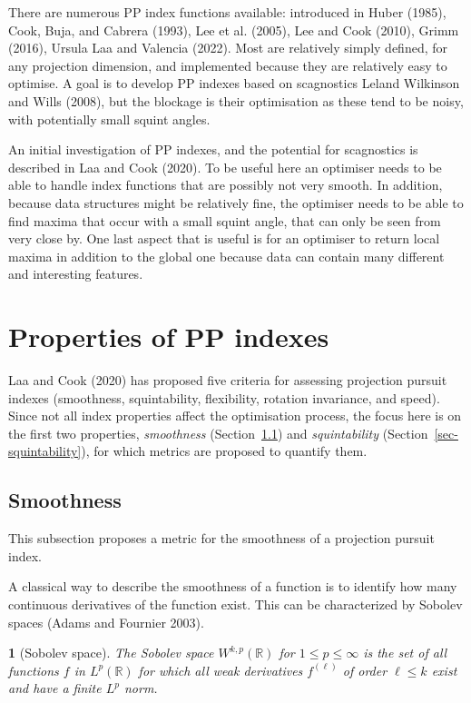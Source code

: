 \documentclass[
  12pt,
]{interact}
\theoremstyle{plain}
\newtheorem{defn}{\protect\definitionname}
\providecommand{\definitionname}{Definition}
\begin{document}
There are numerous PP index functions available: introduced in Huber
(1985), Cook, Buja, and Cabrera (1993), Lee et al. (2005), Lee and Cook
(2010), Grimm (2016), Ursula Laa and Valencia (2022). Most are
relatively simply defined, for any projection dimension, and implemented
because they are relatively easy to optimise. A goal is to develop PP
indexes based on scagnostics Leland Wilkinson and Wills (2008), but the
blockage is their optimisation as these tend to be noisy, with
potentially small squint angles.

An initial investigation of PP indexes, and the potential for
scagnostics is described in Laa and Cook (2020). To be useful here an
optimiser needs to be able to handle index functions that are possibly
not very smooth. In addition, because data structures might be
relatively fine, the optimiser needs to be able to find maxima that
occur with a small squint angle, that can only be seen from very close
by. One last aspect that is useful is for an optimiser to return local
maxima in addition to the global one because data can contain many
different and interesting features.

\hypertarget{sec-PP-properties}{%
\section{Properties of PP indexes}\label{sec-PP-properties}}

Laa and Cook (2020) has proposed five criteria for assessing projection
pursuit indexes (smoothness, squintability, flexibility, rotation
invariance, and speed). Since not all index properties affect the
optimisation process, the focus here is on the first two properties,
\emph{smoothness} (Section~\ref{sec-smoothness}) and
\emph{squintability} (Section~\ref{sec-squintability}), for which
metrics are proposed to quantify them.

\hypertarget{sec-smoothness}{%
\subsection{Smoothness}\label{sec-smoothness}}

This subsection proposes a metric for the smoothness of a projection
pursuit index.

A classical way to describe the smoothness of a function is to identify
how many continuous derivatives of the function exist. This can be
characterized by Sobolev spaces (Adams and Fournier 2003).

\begin{defn}[Sobolev space]\label{def:sobolev_space}
The Sobolev space $W^{k,p}(\mathbb{R})$ for $1\leq p\leq \infty$ is the set of all functions $f$ in $L^p(\mathbb{R})$ for which all weak derivatives $f^{(\ell)}$ of order $\ell\leq k$ exist and have a finite $L^p$ norm.
\end{defn}
\end{document}
